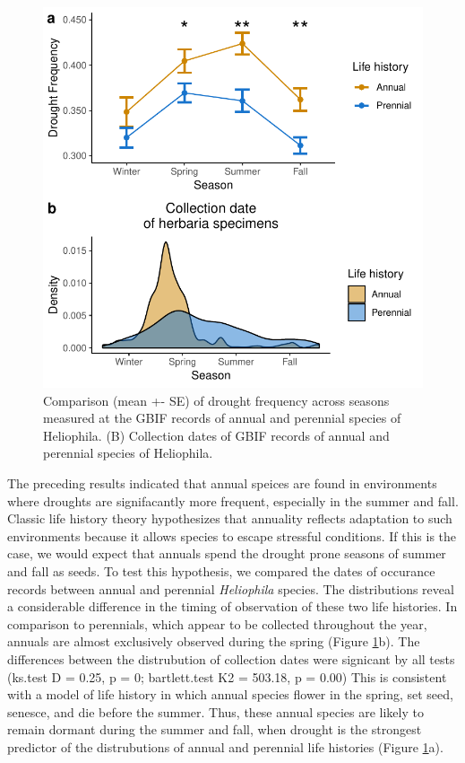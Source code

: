 \documentclass[man,floatsintext]{apa6}
\theoremstyle{definition}
\theoremstyle{definition}
\theoremstyle{definition}
\theoremstyle{remark}
\begin{document}
\begin{figure}
\centering
\includegraphics{../figures/line_and_dates.pdf}
\caption{\label{fig:lineplots}Comparison (mean +- SE) of drought frequency across
seasons measured at the GBIF records of annual and perennial species of
Heliophila. (B) Collection dates of GBIF records of annual and perennial
species of Heliophila.}
\end{figure}

The preceding results indicated that annual speices are found in
environments where droughts are signifacantly more frequent, especially
in the summer and fall. Classic life history theory hypothesizes that
annuality reflects adaptation to such environments because it allows
species to escape stressful conditions. If this is the case, we would
expect that annuals spend the drought prone seasons of summer and fall
as seeds. To test this hypothesis, we compared the dates of occurance
records between annual and perennial \emph{Heliophila} species. The
distributions reveal a considerable difference in the timing of
observation of these two life histories. In comparison to perennials,
which appear to be collected throughout the year, annuals are almost
exclusively observed during the spring (Figure \ref{fig:lineplots}b).
The differences between the distrubution of collection dates were
signicant by all tests (ks.test D = 0.25, p = 0; bartlett.test K2 =
503.18, p = 0.00) This is consistent with a model of life history in
which annual species flower in the spring, set seed, senesce, and die
before the summer. Thus, these annual species are likely to remain
dormant during the summer and fall, when drought is the strongest
predictor of the distrubutions of annual and perennial life histories
(Figure \ref{fig:lineplots}a).
\end{document}
